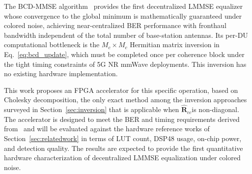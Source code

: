\documentclass[12pt]{article}
\begin{document}
The BCD-MMSE algorithm~\cite{zhao2025jsac} provides the
first decentralized LMMSE equalizer whose convergence to the global minimum is mathematically guaranteed under colored noise,
achieving near-centralized BER performance with fronthaul bandwidth
independent of the total number of base-station antennas. Its per-DU
computational bottleneck is the $M_c \times M_c$ Hermitian matrix
inversion in Eq.~\eqref{eq:bcd_update}, which must be completed once
per coherence block under the tight timing constraints of 5G NR mmWave
deployments. This inversion has no existing hardware implementation.




This work proposes an FPGA accelerator for this specific operation, based on Cholesky decomposition, the only exact method among the inversion approaches surveyed in Section~\ref{sec:inversion} that is applicable when $\hat{\mathbf{R}}_{cc}$is non-diagonal. The
accelerator is designed to meet the BER and timing requirements derived
from~\cite{zhao2025jsac} and will be evaluated against the hardware
reference works of Section~\ref{sec:relatedwork} in terms of LUT count,
DSP48 usage, on-chip power, and detection quality. The results are expected to provide the first quantitative hardware characterization of decentralized LMMSE equalization under colored noise.




\end{document}
